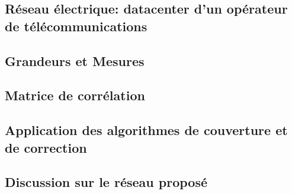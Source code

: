 \subsection{R\'eseau \'electrique: datacenter d'un op\'erateur de t\'el\'ecommunications }
\subsection{Grandeurs et Mesures}
\subsection{Matrice de corr\'elation}
\subsection{Application des algorithmes de couverture et de correction}
\subsection{Discussion sur le r\'eseau propos\'e}